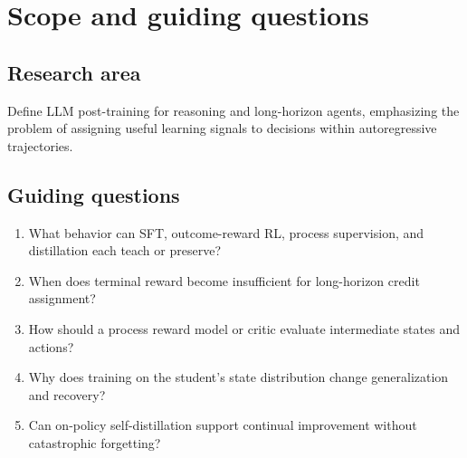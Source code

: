 \section{Scope and guiding questions}

\subsection{Research area}
Define LLM post-training for reasoning and long-horizon agents, emphasizing the problem
of assigning useful learning signals to decisions within autoregressive trajectories.

\subsection{Guiding questions}
\begin{enumerate}
  \item What behavior can SFT, outcome-reward RL, process supervision, and distillation
        each teach or preserve?
  \item When does terminal reward become insufficient for long-horizon credit assignment?
  \item How should a process reward model or critic evaluate intermediate states and actions?
  \item Why does training on the student's state distribution change generalization and recovery?
  \item Can on-policy self-distillation support continual improvement without catastrophic forgetting?
\end{enumerate}

